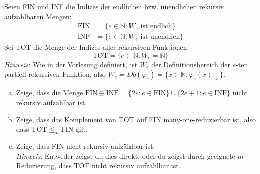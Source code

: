 \documentclass[german,headsepline]{scrartcl}
\theoremstyle{definition}
\begin{document}
	\begin{question}
		Seien FIN und INF die Indizes der endlichen bzw. unendlichen rekursiv aufzählbaren Mengen:
		\begin{align*}
			\text{FIN} &= \{e\in\mathbb{N}\colon W_e\text{ ist endlich}\} \\
			\text{INF} &= \{e\in\mathbb{N}\colon W_e\text{ ist unendlich}\}
		\end{align*}
		Sei TOT die Menge der Indizes aller rekursiven Funktionen:
			\[\text{TOT}=\{e\in\mathbb{N}\colon W_e=\mathbb{N}\}\]
		\textit{Hinweis}: Wie in der Vorlesung definiert,
		ist $W_e$ der Definitionsbereich der $e$-ten partiell rekursiven Funktion,
		also $W_e=Db(\varphi_e)=\{x\in\mathbb{N}\colon\varphi_e(x)\downarrow\}$.
		\begin{enumerate}[(a)]
			\item Zeige, dass die Menge
				$\text{FIN}\oplus\text{INF}=\{2e\colon e\in\text{FIN}\}\cup\{2e+1\colon e\in\text{INF}\}$
				nicht rekursiv aufzählbar ist.
			\item Zeige, dass das Komplement von TOT auf FIN many-one-reduzierbar ist,
				also dass $\overline{\text{TOT}}\leq_m\text{FIN}$ gilt.
			\item Zeige, dass FIN nicht rekursiv aufzählbar ist. \\
				\textit{Hinweis}: Entweder zeigst du dies direkt,
				oder du zeigst durch geeignete $m$-Reduzierung,
				dass $\overline{\text{TOT}}$ nicht rekursiv aufzählbar ist.
		\end{enumerate}
	\end{question}
\end{document}
